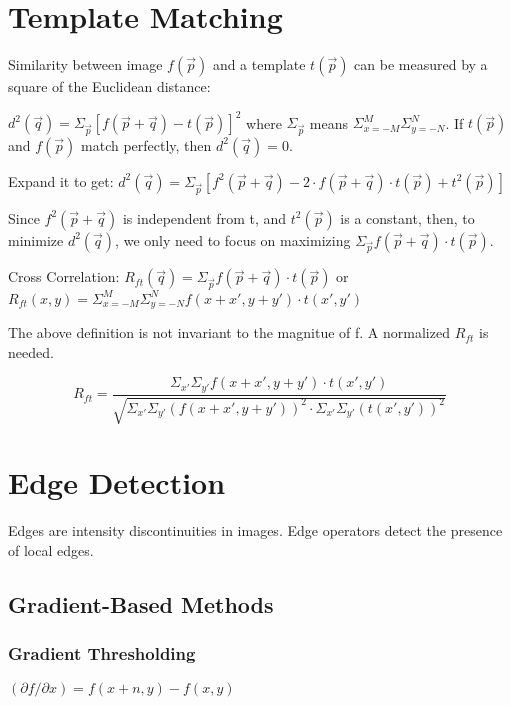 \documentclass{article}
\begin{document}
\begin{multicols}{2}
\section{Template Matching}

Similarity between image $f(\vec p)$ and a template $t(\vec p)$ can be measured by a square of the Euclidean distance:

$d^2(\vec q) = \Sigma_{\vec p}[f(\vec p + \vec q) - t(\vec p)]^2$
where $\Sigma_{\vec p}$ means $\Sigma_{x = -M}^M \Sigma_{y = -N}^N$. If $t(\vec p)$ and $f(\vec p)$ match perfectly, then $d^2(\vec q) = 0$.

Expand it to get:
$d^2(\vec q) = \Sigma_{\vec p}[f^2(\vec p + \vec q) - 2 \cdot f(\vec p + \vec q) \cdot t(\vec p) + t^2(\vec p)]$

Since $f^2(\vec p + \vec q)$ is independent from t, and $t^2(\vec p)$ is a constant, then, to minimize $d^2(\vec q)$, we only need to focus on maximizing $\Sigma_{\vec p} f(\vec p + \vec q) \cdot t(\vec p)$.

Cross Correlation: $R_{ft}(\vec q) = \Sigma_{\vec p} f(\vec p + \vec q) \cdot t(\vec p)$ or $R_{ft}(x, y) = \Sigma_{x = -M}^M \Sigma_{y = -N}^N f(x+x', y+y') \cdot t(x',y')$

The above definition is not invariant to the magnitue of f. A normalized $R_{ft}$ is needed.

$$R_{ft} = \frac{\Sigma_{x'} \Sigma_{y'} f(x+x', y+y') \cdot t(x',y')}{\sqrt{\Sigma_{x'} \Sigma_{y'}(f(x+x', y+y'))^2 \cdot \Sigma_{x'} \Sigma_{y'}(t(x',y'))^2}}$$

\section{Edge Detection}

Edges are intensity discontinuities in images. Edge operators detect the presence of local edges.

\subsection{Gradient-Based Methods}

\subsubsection{Gradient Thresholding}

$(\partial f/\partial x) = f(x+n, y) - f(x,y)$


\end{multicols}
\end{document}
